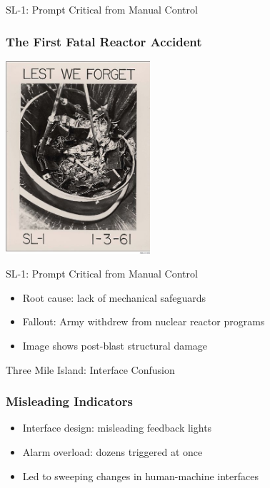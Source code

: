 \documentclass{beamer}
\begin{document}
\begin{frame}{SL-1: Prompt Critical from Manual Control}
  \subsubsection*{The First Fatal Reactor Accident}
  \includegraphics[width=0.4\textwidth]{sl1diagram.jpg}
\end{frame}

\begin{frame}{SL-1: Prompt Critical from Manual Control}
  \begin{itemize}
    \item Root cause: lack of mechanical safeguards
    \item Fallout: Army withdrew from nuclear reactor programs
    \item Image shows post-blast structural damage
  \end{itemize}
\end{frame}

\begin{frame}{Three Mile Island: Interface Confusion}
  \subsubsection*{Misleading Indicators}
  \begin{itemize}
    \item Interface design: misleading feedback lights
    \item Alarm overload: dozens triggered at once
    \item Led to sweeping changes in human-machine interfaces
  \end{itemize}
\end{frame}
\end{document}
